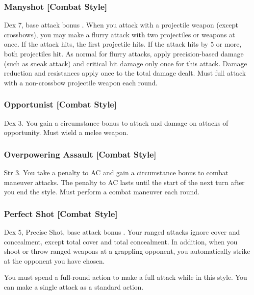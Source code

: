 \subsubsection{Manyshot [Combat Style]}
 Dex 7, base attack bonus .
 When you attack with a projectile weapon (except crossbows), you may make a flurry attack with two projectiles or weapons at once. If the attack hits, the first projectile hits. If the attack hits by 5 or more, both projectiles hit. As normal for flurry attacks, apply precision-based damage (such as sneak attack) and critical hit damage only once for this attack. Damage reduction and resistances apply once to the total damage dealt.
 Must full attack with a non-crossbow projectile weapon each round.

\subsubsection{Opportunist [Combat Style]}
 Dex 3.
 You gain a  circumstance bonus to attack and damage on attacks of opportunity. \babscalingdescription
{} Must wield a melee weapon.

\subsubsection{Overpowering Assault [Combat Style]}
 Str 3.
 You take a  penalty to AC and gain a  circumstance bonus to combat maneuver attacks. \babscalingdescription The penalty to AC lasts until the start of the next turn after you end the style.
 Must perform a combat maneuver each round.

\subsubsection{Perfect Shot [Combat Style]}
 Dex 5, Precise Shot, base attack bonus .
 Your ranged attacks ignore cover and concealment, except total cover and total concealment. In addition, when you shoot or throw ranged weapons at a grappling opponent, you automatically strike at the opponent you have chosen.

You must spend a full-round action to make a full attack while in this style. You can make a single attack as a standard action.

